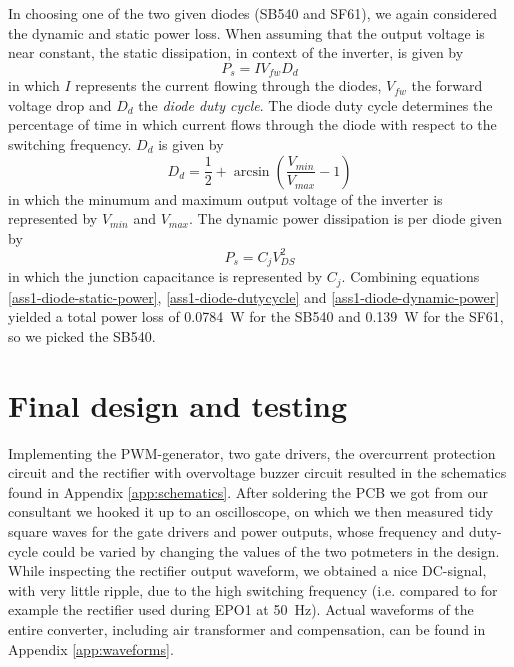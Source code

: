 \documentclass[11pt,titlepage]{report}
\begin{document}
In choosing one of the two given diodes (SB540 and SF61), we again considered the dynamic and static power loss. When assuming that the output voltage is near constant, the static dissipation, in context of the inverter, is given by
\begin{equation}
\label{ass1-diode-static-power}
	P_s = I V_{fw} D_{d}
\end{equation}
in which $I$ represents the current flowing through the diodes, $V_{fw}$ the forward voltage drop and $D_{d}$ the \textit{diode duty cycle}. The diode duty cycle determines the percentage of time in which current flows through the diode with respect to the switching frequency. $D_{d}$ is given by
\begin{equation}
\label{ass1-diode-dutycycle}
	D_d = \frac{1}{2}+\arcsin{ \left( \frac{V_{min}}{V_{max}}-1 \right) }
\end{equation}
in which the minumum and maximum output voltage of the inverter is represented by $V_{min}$ and $V_{max}$. The dynamic power dissipation is per diode given by
\begin{equation}
\label{ass1-diode-dynamic-power}
	P_s = C_j V_{DS}^2
\end{equation}
in which the junction capacitance is represented by $C_j$. Combining equations \ref{ass1-diode-static-power}, \ref{ass1-diode-dutycycle} and \ref{ass1-diode-dynamic-power} yielded a total power loss of \SI{0.0784}{W} for the SB540 and \SI{0.139}{W} for the SF61, so we picked the SB540. \cite{SB540-datasheet,SF61-datasheet}


\section{Final design and testing}
Implementing the PWM-generator, two gate drivers, the overcurrent protection circuit and the rectifier with overvoltage buzzer circuit resulted in the schematics found in Appendix \ref{app:schematics}. %
After soldering the PCB we got from our consultant we hooked it up to an oscilloscope, on which we then measured tidy square waves for the gate drivers and power outputs, whose frequency and duty-cycle could be varied by changing the values of the two potmeters in the design. While inspecting the rectifier output waveform, we obtained a nice DC-signal, with very little ripple, due to the high switching frequency (i.e. compared to for example the rectifier used during EPO1 at \SI{50}{Hz}).
Actual waveforms of the entire converter, including air transformer and compensation, can be found in Appendix \ref{app:waveforms}.
\end{document}
